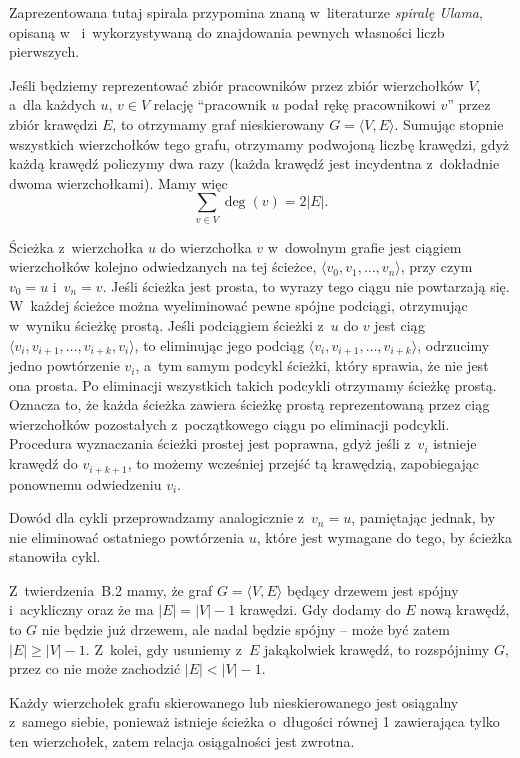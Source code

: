 Zaprezentowana tutaj spirala przypomina znaną w~literaturze \emph{spiralę Ulama}, opisaną w~\cite{ulamspiral} i~wykorzystywaną do znajdowania pewnych własności liczb pierwszych.


\exercise %
Jeśli będziemy reprezentować zbiór pracowników przez zbiór wierzchołków $V$, a~dla każdych $u$, $v\in V$ relację ``pracownik $u$ podał rękę pracownikowi $v$'' przez zbiór krawędzi $E$, to otrzymamy graf nieskierowany $G=\langle V,E\rangle$. Sumując stopnie wszystkich wierzchołków tego grafu, otrzymamy podwojoną liczbę krawędzi, gdyż każdą krawędź policzymy dwa razy (każda krawędź jest incydentna z~dokładnie dwoma wierzchołkami). Mamy więc
\[
	\sum_{v\in V}\deg(v) = 2|E|.
\]

\exercise %
Ścieżka z~wierzchołka $u$ do wierzchołka $v$ w~dowolnym grafie jest ciągiem wierzchołków kolejno odwiedzanych na tej ścieżce, $\langle v_0,v_1,\dots,v_n\rangle$, przy czym $v_0=u$ i~$v_n=v$. Jeśli ścieżka jest prosta, to wyrazy tego ciągu nie powtarzają się. W~każdej ścieżce można wyeliminować pewne spójne podciągi, otrzymując w~wyniku ścieżkę prostą. Jeśli podciągiem ścieżki z~$u$ do $v$ jest ciąg $\langle v_i,v_{i+1},\dots,v_{i+k},v_i\rangle$, to eliminując jego podciąg $\langle v_i,v_{i+1},\dots,v_{i+k}\rangle$, odrzucimy jedno powtórzenie $v_i$, a~tym samym podcykl ścieżki, który sprawia, że nie jest ona prosta. Po eliminacji wszystkich takich podcykli otrzymamy ścieżkę prostą. Oznacza to, że każda ścieżka zawiera ścieżkę prostą reprezentowaną przez ciąg wierzchołków pozostałych z~początkowego ciągu po eliminacji podcykli. Procedura wyznaczania ścieżki prostej jest poprawna, gdyż jeśli z~$v_i$ istnieje krawędź do $v_{i+k+1}$, to możemy wcześniej przejść tą krawędzią, zapobiegając ponownemu odwiedzeniu $v_i$.

Dowód dla cykli przeprowadzamy analogicznie z~$v_n=u$, pamiętając jednak, by nie eliminować ostatniego powtórzenia $u$, które jest wymagane do tego, by ścieżka stanowiła cykl.

\exercise %
Z~twierdzenia~B.2 mamy, że graf $G=\langle V,E\rangle$ będący drzewem jest spójny i~acykliczny oraz że ma $|E|=|V|-1$ krawędzi. Gdy dodamy do $E$ nową krawędź, to $G$ nie będzie już drzewem, ale nadal będzie spójny -- może być zatem $|E|\ge|V|-1$. Z~kolei, gdy usuniemy z~$E$ jakąkolwiek krawędź, to rozspójnimy $G$, przez co nie może zachodzić $|E|<|V|-1$.

\exercise %
Każdy wierzchołek grafu skierowanego lub nieskierowanego jest osiągalny z~samego siebie, ponieważ istnieje ścieżka o~długości równej 1 zawierająca tylko ten wierzchołek, zatem relacja osiągalności jest zwrotna.

